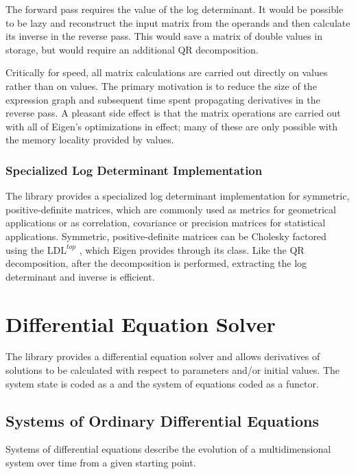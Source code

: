 \documentclass[10pt]{article}
\begin{document}
The forward pass requires the value of the log determinant.  It would
be possible to be lazy and reconstruct the input matrix from the
operands and then calculate its inverse in the reverse pass.  This
would save a matrix of double values in storage, but would require an
additional QR decomposition.

Critically for speed, all matrix calculations are carried out directly
on  values rather than on  values.  The primary
motivation is to reduce the size of the expression graph and
subsequent time spent propagating derivatives in the reverse pass.  A
pleasant side effect is that the matrix operations are carried out
with all of Eigen's optimizations in effect; many of these are only
possible with the memory locality provided by  values.


\subsubsection{Specialized Log Determinant Implementation}

The  library provides a specialized log determinant
implementation for symmetric, positive-definite matrices, which are
commonly used as metrics for geometrical applications or as
correlation, covariance or precision matrices for statistical
applications.  Symmetric, positive-definite matrices can be Cholesky factored
using the $\mbox{LDL}^{top}$ 
\citep[Chapter~4]{GolubVanLoan:96}, which Eigen provides through its
 class.  Like the QR decomposition, after the decomposition
is performed, extracting the log determinant and inverse is efficient.



\section{Differential Equation Solver}

The  library provides a differential equation solver
and allows derivatives of solutions to be calculated with respect to
parameters and/or initial values.  The system state is coded as a
 and the system of equations coded as a functor.

\subsection{Systems of Ordinary Differential Equations}

Systems of differential equations describe the evolution of a
multidimensional system over time from a given starting point.  
\end{document}
